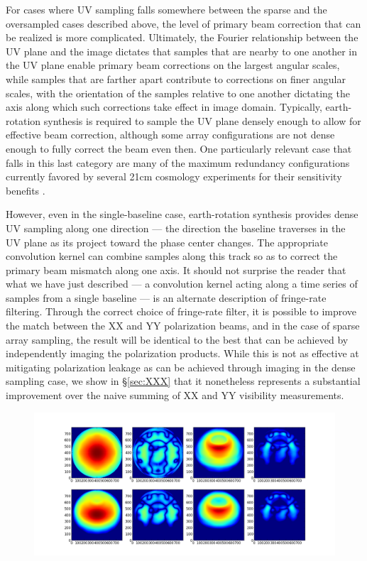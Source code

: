 \documentclass[twocolumn,apj,numberedappendix]{emulateapj}
\begin{document}
For cases where UV sampling falls somewhere between the sparse and the oversampled cases described above, the level
of primary beam correction that can be realized is more complicated.  Ultimately, the Fourier relationship between
the UV plane and the image dictates that samples that are nearby to one
another in the UV plane enable primary beam corrections on the largest angular scales, while samples that are farther
apart contribute to corrections on finer angular scales, with the orientation of the samples relative to one another
dictating the axis along which such corrections take effect in image domain.  Typically, earth-rotation synthesis
is required to sample the UV plane densely enough to allow for effective beam correction, although some array
configurations are not dense enough to fully correct the beam even then.  One particularly relevant case that falls
in this last category are many of the maximum redundancy configurations currently favored by several 21cm cosmology experiments
for their sensitivity benefits \citep{parsons_et_al2012a,parsons_et_al2014}.

However, even in the single-baseline case, earth-rotation synthesis provides dense UV sampling along one direction --- the
direction the baseline traverses in the UV plane as its project toward the phase center changes.  The appropriate
convolution kernel can combine samples along this track so as to correct the primary beam mismatch along one axis.
It should not surprise the reader that what we have just described --- a convolution kernel acting along a time series
of samples from a single baseline --- is an alternate description of fringe-rate filtering.  Through the correct
choice of fringe-rate filter, it is possible to improve the match between the XX and YY polarization beams, and
in the case of sparse array sampling, the result will be identical to the best that can be achieved by independently
imaging the polarization products.  While this is not as effective at mitigating polarization leakage as can be achieved
through imaging in the dense sampling case, we show in \S\ref{sec:XXX} that it nonetheless represents a substantial improvement
over the naive summing of XX and YY visibility measurements.


\begin{figure}\centering
\includegraphics[width=.9\columnwidth]{plots/fringe_beam_wgts.png}
\caption{
}\label{fig:fringe_beam_wgts}
\end{figure}
\end{document}
